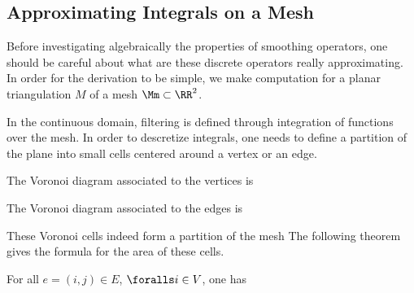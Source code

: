 \subsection{Approximating Integrals on a Mesh}

Before investigating algebraically the properties of smoothing operators, one should be careful about what are these discrete operators really approximating. In order for the derivation to be simple, we make computation for a planar triangulation $M$ of a mesh $\Mm \subset \RR^2$.

In the continuous domain, filtering is defined through integration of functions over the mesh. In order to descretize integrals, one needs to define a partition of the plane into small cells centered around a vertex or an edge.

\begin{defn}\label{defn-vertex-voronoi} The Voronoi diagram associated to the vertices is
\end{defn}


\begin{defn} The Voronoi diagram associated to the edges is
\end{defn}




These Voronoi cells indeed form a partition of the mesh
The following theorem gives the formula for the area of these cells.

\begin{thm} For all $e=(i,j) \in E$, $\foralls i\in V$, one has
\end{thm}


